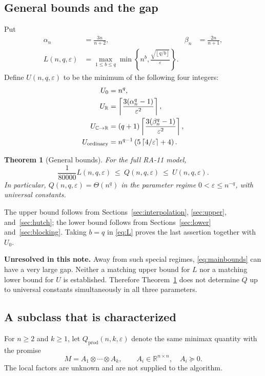 \documentclass[11pt]{article}
\newtheorem{theorem}{Theorem}[section]
\theoremstyle{definition}\newtheorem{definition}[theorem]{Definition}
\theoremstyle{remark}\newtheorem{remark}[theorem]{Remark}
\newcommand{\R}{\mathbb R}\newcommand{\C}{\mathbb C}
\newcommand{\eps}{\varepsilon}\newcommand{\Qprod}{Q_{\mathrm{prod}}}
\newcommand{\ceil}[1]{\left\lceil#1\right\rceil}
\newcommand{\floor}[1]{\left\lfloor#1\right\rfloor}
\begin{document}
\subsection{General bounds and the gap}
Put
\begin{align}
 \alpha_n&=\frac{3n}{n+2}, & \beta_n&=\frac{2n}{n+1},\\
 L(n,q,\eps)&=\max_{1\le b\le q}
       \min\left\{n^b,\frac{\sqrt{\floor{q/b}}}{\eps}\right\}.
 \label{eq:L}
\end{align}
Define $U(n,q,\eps)$ to be the minimum of the following four integers:
\begin{align}
 U_0&=n^q,\label{eq:U0}\\
 U_{\R}&=\ceil{\frac{3(\alpha_n^q-1)}{\eps^2}},\label{eq:UR}\\
 U_{\C\to\R}&=(q+1)\ceil{\frac{3(\beta_n^q-1)}{\eps^2}},\label{eq:UC}\\
 U_{\rm ordinary}&=n^{q-1}\left(5\ceil{4/\eps}+4\right).
 \label{eq:Uordinary}
\end{align}

\begin{theorem}[General bounds]\label{thm:main}
For the full RA-11 model,
\begin{equation}\label{eq:mainbounds}
 \frac{1}{80000}L(n,q,\eps)
       \ \le\ Q(n,q,\eps)\ \le\ U(n,q,\eps).
\end{equation}
In particular, $Q(n,q,\eps)=\Theta(n^q)$ in the parameter regime
$0<\eps\le n^{-q}$, with universal constants.
\end{theorem}

The upper bound follows from Sections~\ref{sec:interpolation},
\ref{sec:upper}, and~\ref{sec:hutch}; the lower bound follows from
Sections~\ref{sec:lower} and~\ref{sec:blocking}. Taking $b=q$ in
\eqref{eq:L} proves the last assertion together with $U_0$.

\textbf{Unresolved in this note.} Away from such special regimes,
\eqref{eq:mainbounds} can have a very large gap. Neither a matching upper bound
for $L$ nor a matching lower bound for $U$ is established. Therefore
Theorem~\ref{thm:main} does not determine $Q$ up to universal constants
simultaneously in all three parameters.

\subsection{A subclass that is characterized}
For $n\ge2$ and $k\ge1$, let $\Qprod(n,k,\eps)$ denote the same minimax
quantity with the promise
\begin{equation}\label{eq:productpromise}
 M=A_1\otimes\cdots\otimes A_k,\qquad A_i\in\R^{n\times n},\quad A_i\succeq0.
\end{equation}
The local factors are unknown and are not supplied to the algorithm.
\end{document}
